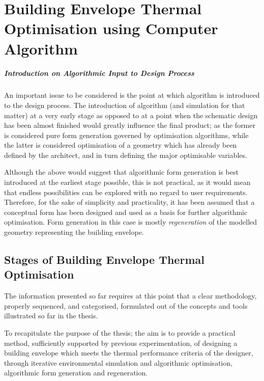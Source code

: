 \chapter{Building Envelope Thermal Optimisation using Computer Algorithm}

\paragraph{Introduction on Algorithmic Input to Design Process}\mbox{}

An important issue to be considered is the point at which algorithm is introduced to the design process. The introduction of algorithm (and simulation for that matter) at a very early stage as opposed to at a point when the schematic design has been almost finished would greatly influence the final product; as the former is considered pure form generation governed by optimisation algorithms, while the latter is considered optimisation of a geometry which has already been defined by the architect, and in turn defining the major optimisable variables.

Although the above would suggest that algorithmic form generation is best introduced at the earliest stage possible, this is not practical, as it would mean that endless possibilities can be explored with no regard to user requirements. Therefore, for the sake of simplicity and practicality, it has been assumed that a conceptual form has been designed and used as a basis for further algorithmic optimisation. Form generation in this case is mostly \emph{regeneration} of the modelled geometry representing the building envelope.

\section{Stages of Building Envelope Thermal Optimisation}

The information presented so far requires at this point that a clear methodology, properly sequenced, and categorised, formulated out of the concepts and tools illustrated so far in the thesis.

To recapitulate the purpose of the thesis; the aim is to provide a practical method, sufficiently supported by previous experimentation, of designing a building envelope which meets the thermal performance criteria of the designer, through iterative environmental simulation and algorithmic optimisation, algorithmic form generation and regeneration.


